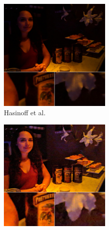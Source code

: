 \documentclass{sig-alternate}
\begin{document}
\begin{figure}
\centering
\begin{subfigure}{13pc}
\centering
\includegraphics[width=13pc]{figures/liba2019-figure-1a-95quality.jpg}
\caption{Hasinoff et al.}
\label{fig:libaResults:hasinoff}
\end{subfigure}
\begin{subfigure}{13pc}
\centering
\includegraphics[width=13pc]{figures/liba2019-figure-1b-95quality.jpg}

\end{subfigure}
\end{figure}
\end{document}
